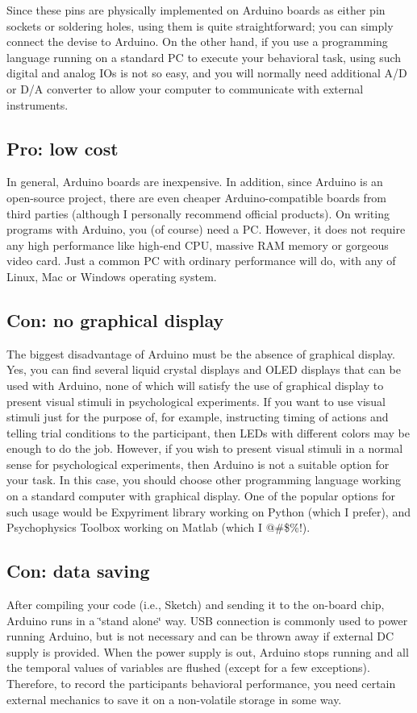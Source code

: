 Since these pins are physically implemented on Arduino boards as either pin sockets or soldering holes, using them is quite straightforward; you can simply connect the devise to Arduino. On the other hand, if you use a programming language running on a standard PC to execute your behavioral task, using such digital and analog I\+Os is not so easy, and you will normally need additional A/D or D/A converter to allow your computer to communicate with external instruments.\hypertarget{index_s1ss3}{}\subsection{Pro\+: low cost}\label{index_s1ss3}
In general, Arduino boards are inexpensive. In addition, since Arduino is an open-\/source project, there are even cheaper Arduino-\/compatible boards from third parties (although I personally recommend official products). On writing programs with Arduino, you (of course) need a PC. However, it does not require any high performance like high-\/end C\+PU, massive R\+AM memory or gorgeous video card. Just a common PC with ordinary performance will do, with any of Linux, Mac or Windows operating system.\hypertarget{index_s1ss4}{}\subsection{Con\+: no graphical display}\label{index_s1ss4}
The biggest disadvantage of Arduino must be the absence of graphical display. Yes, you can find several liquid crystal displays and O\+L\+ED displays that can be used with Arduino, none of which will satisfy the use of graphical display to present visual stimuli in psychological experiments. If you want to use visual stimuli just for the purpose of, for example, instructing timing of actions and telling trial conditions to the participant, then L\+E\+Ds with different colors may be enough to do the job. However, if you wish to present visual stimuli in a normal sense for psychological experiments, then Arduino is not a suitable option for your task. In this case, you should choose other programming language working on a standard computer with graphical display. One of the popular options for such usage would be Expyriment library working on Python (which I prefer), and Psychophysics Toolbox working on Matlab (which I @\#\$\%!).\hypertarget{index_s1ss5}{}\subsection{Con\+: data saving}\label{index_s1ss5}
After compiling your code (i.\+e., Sketch) and sending it to the on-\/board chip, Arduino runs in a \char`\"{}stand alone\char`\"{} way. U\+SB connection is commonly used to power running Arduino, but is not necessary and can be thrown away if external DC supply is provided. When the power supply is out, Arduino stops running and all the temporal values of variables are flushed (except for a few exceptions). Therefore, to record the participant\textquotesingle{}s behavioral performance, you need certain external mechanics to save it on a non-\/volatile storage in some way.

